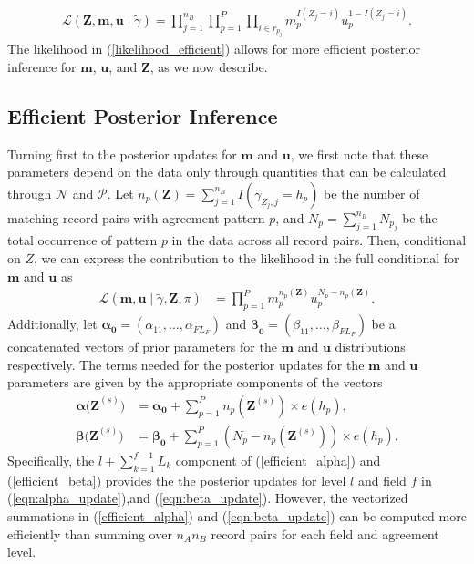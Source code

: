 \documentclass[ba]{imsart}
\begin{document}
\begin{align}\label{likelihood_efficient}
	\mathcal{L}(\bm{Z}, \bm{m}, \bm{u} \mid \tilde{\gamma}) = \prod_{j=1}^{n_B}\prod_{p=1}^P \prod_{i \in r_{p_j}} m_p^{I(Z_j = i)}u_p^{1 - I(Z_j = i)}. 
\end{align}
The likelihood in (\ref{likelihood_efficient}) allows for more
efficient posterior inference for $\bm{m}$, $\bm{u}$, and $\bm{Z}$, as we now describe.

\hypertarget{efficient-posterior}{%
	\subsection{Efficient Posterior Inference }\label{efficient-posterior}}

Turning first to the posterior updates for $\bm{m}$ and $\bm{u}$, we first note that these parameters depend on the data only through quantities that can be calculated through $\mathcal{N}$ and $\mathcal{P}$. Let $n_p(\bm{Z}) = \sum_{j=1}^{n_B} I\left(\gamma_{Z_j, j} = h_p \right)$ be the number of matching record pairs with agreement pattern $p$, and $N_p = \sum_{j=1}^{n_B} N_{p_j}$ be the total occurrence of pattern $p$ in the data across all record pairs. Then, conditional on $Z$, we can express the contribution to the likelihood in the full conditional for $\bm{m}$ and $\bm{u}$ as
\begin{align}
	\mathcal{L}(\bm{m}, \bm{u} \mid \tilde{\gamma}, \bm{Z}, \pi)  &=  \prod_{p=1}^P m_p^{n_p(\bm{Z})}u_p^{N_p - n_p(\bm{Z})}  \label{likelihood_efficient_m_u}.
\end{align}
Additionally, let $\bm{\alpha_0} = (\alpha_{11}, \ldots, \alpha_{F L_F})$ and $\bm{\beta_0}= (\beta_{11}, \ldots, \beta_{F L_F})$ be a concatenated vectors of prior parameters for the $\bm{m}$ and $\bm{u}$ distributions respectively. The terms needed for the posterior updates for the $\bm{m}$ and $\bm{u}$ parameters are given by the appropriate components of the vectors
\begin{subequations}
	\begin{align}
		\bm{\alpha(Z}^{(s)}\bm{)} &= \bm{\alpha_0} + \sum_{p=1}^P n_p\left(\bm{Z}^{(s)}\right) \times e(h_p), \label{efficient_alpha} \\
		\bm{\beta(Z}^{(s)}\bm{)} &= \bm{\beta_0} + \sum_{p=1}^P \left(N_p - n_p\left(\bm{Z}^{(s)}\right)\right) \times e(h_p). \label{efficient_beta}
	\end{align}
\end{subequations}
Specifically, the $l + \sum_{k=1}^{f-1} L_k$ component of (\ref{efficient_alpha}) and (\ref{efficient_beta}) provides the the posterior updates for level $l$ and field $f$ in (\ref{eqn:alpha_update}),and (\ref{eqn:beta_update}). However, the vectorized summations in (\ref{efficient_alpha}) and (\ref{eqn:beta_update}) can be computed more efficiently than summing over $n_A n_B$ record pairs for each field and agreement level.
\end{document}
